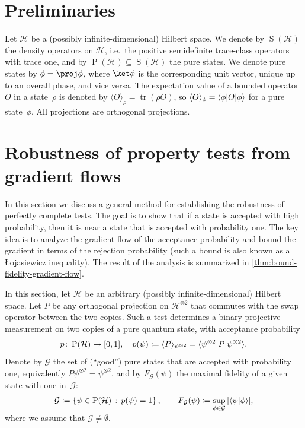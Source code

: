\documentclass[11pt,a4paper]{article}
\numberwithin{equation}{section}
\newcommand{\ot}{\otimes}
\newcommand{\HH}{\mathcal{H}}
\newcommand{\GG}{\mathcal G}
\newcommand{\1}{\mathbf{1}}
\renewcommand{\S}{\operatorname{S}}
\renewcommand{\P}{\operatorname{P}}
\DeclareMathOperator{\tr}{tr}
\DeclarePairedDelimiter\abs{\lvert}{\rvert}
\DeclarePairedDelimiter\ip{\langle}{\rangle}
\begin{document}
\section{Preliminaries}
Let $\HH$ be a (possibly infinite-dimensional) Hilbert space.
We denote by $\S(\HH)$ the density operators on $\HH$, i.e.\ the positive semidefinite trace-class operators with trace one, and by $\P(\HH) \subseteq \S(\HH)$ the pure states.
We denote pure states by $\phi = \proj\phi$, where $\ket\phi$ is the corresponding unit vector, unique up to an overall phase, and vice versa.
The expectation value of a bounded operator~$O$ in a state~$\rho$ is denoted by $\langle O \rangle_\rho = \tr(\rho O)$, so $\langle O \rangle_\phi = \ip{\phi | O | \phi}$ for a pure state~$\phi$.
All projections are orthogonal projections.

\section{Robustness of property tests from gradient flows}\label{sec:gradient-flow}
In this section we discuss a general method for establishing the robustness of perfectly complete tests.
The goal is to show that if a state is accepted with high probability, then it is near a state that is accepted with probability one.
The key idea is to analyze the gradient flow of the acceptance probability and bound the gradient in terms of the rejection probability (such a bound is also known as a \L{}ojasiewicz inequality).
The result of the analysis is summarized in \cref{thm:bound-fidelity-gradient-flow}.

In this section, let $\HH$ be an arbitrary (possibly infinite-dimensional) Hilbert space.
Let $P$ be any orthogonal projection on $\HH^{\ot 2}$ that commutes with the swap operator between the two copies.
Such a test determines a binary projective measurement on two copies of a pure quantum state, with acceptance probability
\begin{align}\label{eq:p-accept-2-copies}
    p \colon \P(\HH) \to [0,1], \quad p(\psi) \coloneq \ip{P}_{\psi^{\ot 2}} = \ip{\psi^{\ot 2} | P | \psi^{\ot 2}}.
\end{align}
Denote by $\GG$ the set of (``good'') pure states that are accepted with probability one, equivalently $P \psi^{\ot 2} = \psi^{\ot 2}$, and by $F_{\GG}(\psi)$ the maximal fidelity of a given state with one in~$\GG$:
\begin{align}\label{eq:define-F-and-G}
    \GG \coloneqq \{ \psi \in \P(\HH) \, : \, p(\psi) = 1 \} \, ,
    \qquad
    F_{\GG}(\psi) \coloneqq \smash{\sup_{\phi \in \GG}} \, \abs{\ip{\psi|\phi}},
\end{align}
where we assume that $\GG\neq\emptyset$.
\end{document}
